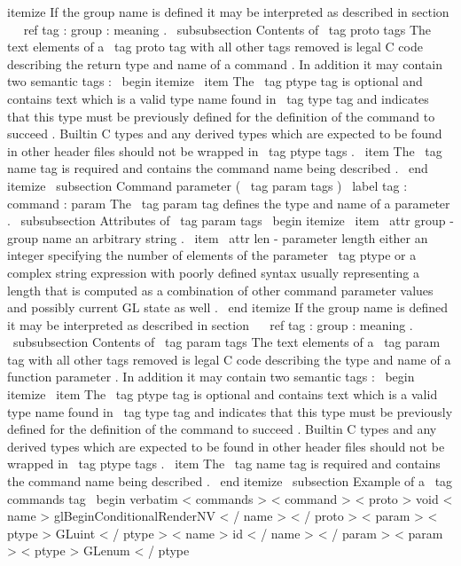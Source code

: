 {
itemize
}
If
the
group
name
is
defined
it
may
be
interpreted
as
described
in
section
~
\
ref
{
tag
:
group
:
meaning
}
.
\
subsubsection
{
Contents
of
\
tag
{
proto
}
tags
}
The
text
elements
of
a
\
tag
{
proto
}
tag
with
all
other
tags
removed
is
legal
C
code
describing
the
return
type
and
name
of
a
command
.
In
addition
it
may
contain
two
semantic
tags
:
\
begin
{
itemize
}
\
item
The
\
tag
{
ptype
}
tag
is
optional
and
contains
text
which
is
a
valid
type
name
found
in
\
tag
{
type
}
tag
and
indicates
that
this
type
must
be
previously
defined
for
the
definition
of
the
command
to
succeed
.
Builtin
C
types
and
any
derived
types
which
are
expected
to
be
found
in
other
header
files
should
not
be
wrapped
in
\
tag
{
ptype
}
tags
.
\
item
The
\
tag
{
name
}
tag
is
required
and
contains
the
command
name
being
described
.
\
end
{
itemize
}
\
subsection
{
Command
parameter
(
\
tag
{
param
}
tags
)
}
\
label
{
tag
:
command
:
param
}
The
\
tag
{
param
}
tag
defines
the
type
and
name
of
a
parameter
.
\
subsubsection
{
Attributes
of
\
tag
{
param
}
tags
}
\
begin
{
itemize
}
\
item
\
attr
{
group
}
-
group
name
an
arbitrary
string
.
\
item
\
attr
{
len
}
-
parameter
length
either
an
integer
specifying
the
number
of
elements
of
the
parameter
\
tag
{
ptype
}
or
a
complex
string
expression
with
poorly
defined
syntax
usually
representing
a
length
that
is
computed
as
a
combination
of
other
command
parameter
values
and
possibly
current
GL
state
as
well
.
\
end
{
itemize
}
If
the
group
name
is
defined
it
may
be
interpreted
as
described
in
section
~
\
ref
{
tag
:
group
:
meaning
}
.
\
subsubsection
{
Contents
of
\
tag
{
param
}
tags
}
The
text
elements
of
a
\
tag
{
param
}
tag
with
all
other
tags
removed
is
legal
C
code
describing
the
type
and
name
of
a
function
parameter
.
In
addition
it
may
contain
two
semantic
tags
:
\
begin
{
itemize
}
\
item
The
\
tag
{
ptype
}
tag
is
optional
and
contains
text
which
is
a
valid
type
name
found
in
\
tag
{
type
}
tag
and
indicates
that
this
type
must
be
previously
defined
for
the
definition
of
the
command
to
succeed
.
Builtin
C
types
and
any
derived
types
which
are
expected
to
be
found
in
other
header
files
should
not
be
wrapped
in
\
tag
{
ptype
}
tags
.
\
item
The
\
tag
{
name
}
tag
is
required
and
contains
the
command
name
being
described
.
\
end
{
itemize
}
\
subsection
{
Example
of
a
\
tag
{
commands
}
tag
}
\
begin
{
verbatim
}
<
commands
>
<
command
>
<
proto
>
void
<
name
>
glBeginConditionalRenderNV
<
/
name
>
<
/
proto
>
<
param
>
<
ptype
>
GLuint
<
/
ptype
>
<
name
>
id
<
/
name
>
<
/
param
>
<
param
>
<
ptype
>
GLenum
<
/
ptype
